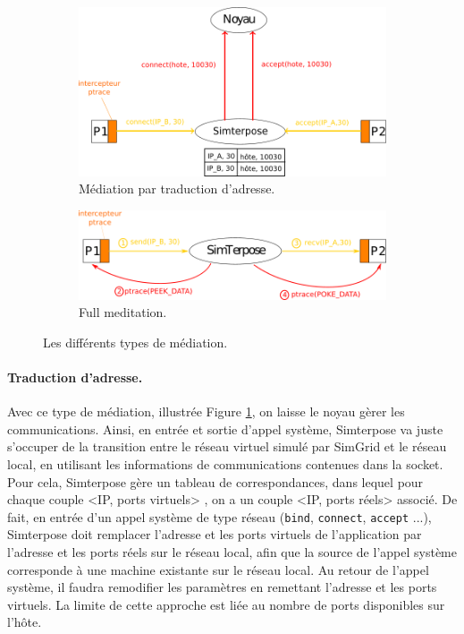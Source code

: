  \begin{figure}[H]
   \centering
   \begin{subfigure}{0.5\textwidth}
   \includegraphics[scale=0.5]{Pictures/png/Mediation_translation_v2}
   \caption{Médiation par traduction d'adresse.}
   \label{ADDRESS_TRANSLATION}
   \end{subfigure}
   \begin{subfigure}{0.4\textwidth}
     \includegraphics[scale=0.5]{Pictures/png/Mediation_full_v2}
  \caption{Full meditation.}
  \label{FULL_MEDIATION}
   \end{subfigure}
   \caption{Les différents types de médiation.}
   \label{MEDIATION}
 \end{figure}
 
\paragraph{Traduction d'adresse.}
 Avec ce type de médiation, illustrée Figure \ref{ADDRESS_TRANSLATION}, on laisse le noyau gèrer les communications. Ainsi, en entrée et sortie d'appel système, Simterpose va juste s'occuper de la transition entre le réseau virtuel simulé
 par SimGrid et le réseau local, en utilisant les informations de communications
 contenues dans la socket. Pour cela, Simterpose gère un tableau de
 correspondances, dans lequel pour chaque couple <IP, ports virtuels> , on a un
 couple <IP, ports réels> associé.  De fait, en entrée d'un appel système de
 type réseau (\texttt{bind}, \texttt{connect}, \texttt{accept} ...), Simterpose
 doit remplacer l'adresse et les ports virtuels de l'application par l'adresse
 et les ports réels sur le réseau local, afin que la source de l'appel système
 corresponde à une machine existante sur le réseau local. Au retour de l'appel
 système, il faudra remodifier les paramètres en remettant l'adresse et les
 ports virtuels. La limite de cette approche est liée au nombre de
 ports disponibles sur l'hôte.

